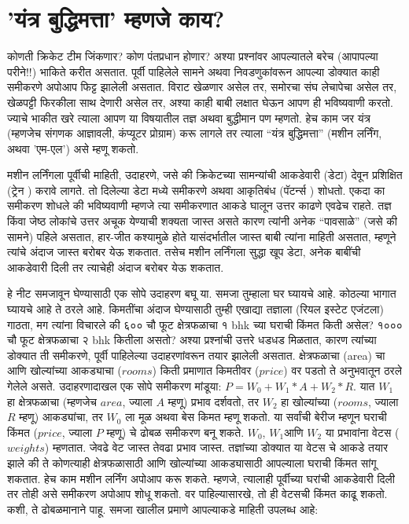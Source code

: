 \chapter{'यंत्र बुद्धिमत्ता' म्हणजे काय?}
कोणती क्रिकेट टीम जिंकणार? कोण पंतप्रधान होणार? अश्या प्रश्नांवर आपल्यातले बरेच (आपापल्या परीने!!) भाकिते करीत असतात. पूर्वी पाहिलेले सामने अथवा निवडणुकांवरून आपल्या डोक्यात काही समीकरणे अपोआप फिट्ट झालेली असतात. विराट खेळणार असेल तर, समोरचा संघ लेचापेचा असेल तर, खेळपट्टी फिरकीला साथ देणारी असेल तर, अश्या काही बाबी लक्षात घेऊन आपण ही भविष्यवाणी करतो. ज्याचे भाकीत खरे त्याला आपण या विषयातील तज्ञ अथवा बुद्धीमान पण म्हणतो. हेच काम जर यंत्र (म्हणजेच संगणक आज्ञावली, कंप्यूटर प्रोग्राम) करू लागले तर त्याला ``यंत्र बुद्धिमत्ता'' (मशीन लर्निंग, अथवा 'एम-एल') असे म्हणू शकतो.

मशीन लर्निंगला पूर्वीची माहिती, उदाहरणे, जसे की क्रिकेटच्या सामन्यांची आकडेवारी (डेटा) देवून प्रशिक्षित (ट्रेन ) करावे लागते. तो दिलेल्या डेटा मध्ये समीकरणे अथवा आकृतिबंध (पॅटर्न्स ) शोधतो. एकदा का समीकरण शोधले की भविष्यवाणी म्हणजे त्या समीकरणात आकडे घालून उत्तर काढणे एवढेच राहते. तज्ञ किंवा जेष्ठ लोकांचे उत्तर अचूक येण्याची शक्यता जास्त असते कारण त्यांनी अनेक ``पावसाळे'' (जसे की सामने) पहिले असतात, हार-जीत कश्यामुळे होते यासंदर्भातील जास्त बाबी त्यांना माहिती असतात, म्हणूने त्यांचे अंदाज जास्त बरोबर येऊ शकतात. तसेच मशीन लर्निंगला सुद्धा खूप डेटा, अनेक बाबींची आकडेवारी दिली तर त्याचेही अंदाज बरोबर येऊ शकतात.

हे नीट समजावून घेण्यासाठी एक सोपे उदाहरण बघू या. समजा तुम्हाला घर घ्यायचे आहे. कोठल्या भागात घ्यायचे आहे ते ठरले आहे. किमतींचा अंदाज घेण्यासाठी तुम्ही एखाद्या तज्ञाला (रियल इस्टेट एजंटला) गाठता, मग त्यांना विचारले की ६०० चौ फूट क्षेत्रफळाचा १ bhk च्या घराची किंमत किती असेल? १००० चौ फूट क्षेत्रफळाचा २ bhk कितीला असतो? अश्या प्रश्नांची उत्तरे धडधड मिळतात, कारण त्यांच्या डोक्यात ती समीकरणे, पूर्वी पाहिलेल्या उदाहरणांवरून तयार झालेली असतात. क्षेत्रफळाचा (area) चा आणि खोल्यांच्या आकड्याचा ($rooms$) किती प्रमाणात किमतीवर ($price$) वर पडतो ते अनुभवातून ठरले गेलेले असते. उदाहरणादाखल एक सोपे समीकरण मांडूया: $P = W_0 + W_1 * A + W_2 * R$. यात $W_1$ हा क्षेत्रफळाचा (म्हणजेच $area$, ज्याला $A$ म्हणू) प्रभाव दर्शवतो, तर $W_2$ हा खोल्यांच्या ($rooms$, ज्याला $R$ म्हणू) आकड्यांचा, तर $W_0$ ला मूळ अथवा बेस किमत म्हणू शकतो. या सर्वांची बेरीज म्हणून घराची किंमत ($price$, ज्याला $P$ म्हणू) चे ढोबळ समीकरण बनू शकते. $W_0$, $W_1 $आणि $W_2$ या प्रभावांना वेटस ($weights$) म्हणतात. जेवढे वेट जास्त तेवढा प्रभाव जास्त. तज्ञांच्या डोक्यात या वेटस चे आकडे तयार झाले की ते कोणत्याही क्षेत्रफळासाठी आणि खोल्यांच्या आकड्यासाठी आपल्याला घराची किंमत सांगू शकतात. हेच काम मशीन लर्निंग अपोआप करू शकते. म्हणजे, त्यालाही पूर्वीच्या घरांची आकडेवारी दिली तर तोही असे समीकरण अपोआप शोधू शकतो. वर पाहिल्यासारखे, तो ही वेटसची किंमत काढू शकतो. कशी, ते ढोबळमानाने पाहू. समजा खालील प्रमाणे आपल्याकडे माहिती उपलब्ध आहे:

